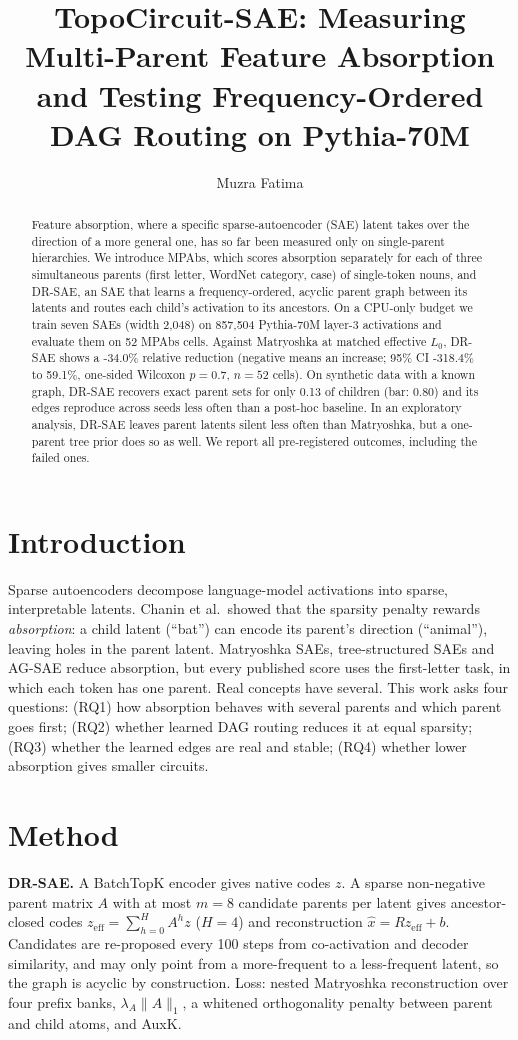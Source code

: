 \documentclass[10pt]{article}
\title{TopoCircuit-SAE: Measuring Multi-Parent Feature Absorption and Testing Frequency-Ordered DAG Routing on Pythia-70M}
\author{Muzra Fatima}
\date{}
\begin{document}
\maketitle

\begin{abstract}
Feature absorption, where a specific sparse-autoencoder (SAE) latent takes over the direction of a more general one, has so far been measured only on single-parent hierarchies. We introduce MPAbs, which scores absorption separately for each of three simultaneous parents (first letter, WordNet category, case) of single-token nouns, and DR-SAE, an SAE that learns a frequency-ordered, acyclic parent graph between its latents and routes each child's activation to its ancestors. On a CPU-only budget we train seven SAEs (width 2{,}048) on 857{,}504 Pythia-70M layer-3 activations and evaluate them on 52 MPAbs cells. Against Matryoshka at matched effective $L_0$, DR-SAE shows a -34.0\% relative reduction (negative means an increase; 95\% CI -318.4\% to 59.1\%, one-sided Wilcoxon $p = 0.7$, $n = 52$ cells). On synthetic data with a known graph, DR-SAE recovers exact parent sets for only 0.13 of children (bar: 0.80) and its edges reproduce across seeds less often than a post-hoc baseline. In an exploratory analysis, DR-SAE leaves parent latents silent less often than Matryoshka, but a one-parent tree prior does so as well. We report all pre-registered outcomes, including the failed ones.
\end{abstract}

\section{Introduction}
Sparse autoencoders decompose language-model activations into sparse, interpretable latents. Chanin et al.\ showed that the sparsity penalty rewards \emph{absorption}: a child latent (``bat'') can encode its parent's direction (``animal''), leaving holes in the parent latent. Matryoshka SAEs, tree-structured SAEs and AG-SAE reduce absorption, but every published score uses the first-letter task, in which each token has one parent. Real concepts have several. This work asks four questions: (RQ1) how absorption behaves with several parents and which parent goes first; (RQ2) whether learned DAG routing reduces it at equal sparsity; (RQ3) whether the learned edges are real and stable; (RQ4) whether lower absorption gives smaller circuits.

\section{Method}
\textbf{DR-SAE.} A BatchTopK encoder gives native codes $z$. A sparse non-negative parent matrix $A$ with at most $m = 8$ candidate parents per latent gives ancestor-closed codes $z_{\mathrm{eff}} = \sum_{h=0}^{H} A^h z$ ($H = 4$) and reconstruction $\hat x = R z_{\mathrm{eff}} + b$. Candidates are re-proposed every 100 steps from co-activation and decoder similarity, and may only point from a more-frequent to a less-frequent latent, so the graph is acyclic by construction. Loss: nested Matryoshka reconstruction over four prefix banks, $\lambda_A\lVert A\rVert_1$, a whitened orthogonality penalty between parent and child atoms, and AuxK.
\end{document}
